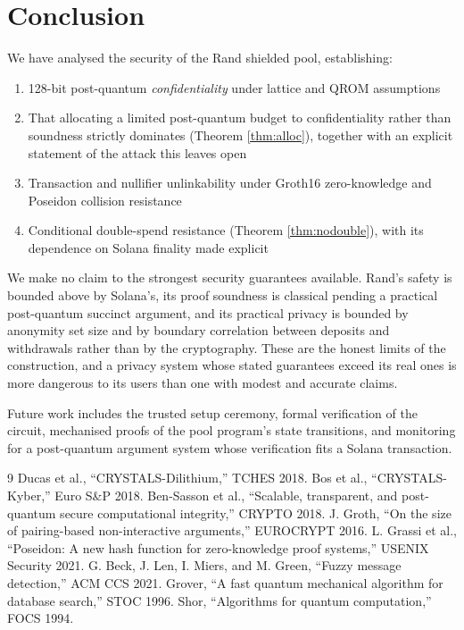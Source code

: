 \documentclass[11pt,a4paper]{article}
\begin{document}
\section{Conclusion}

We have analysed the security of the Rand shielded pool, establishing:

\begin{enumerate}
    \item 128-bit post-quantum \emph{confidentiality} under lattice and QROM assumptions
    \item That allocating a limited post-quantum budget to confidentiality rather than soundness strictly dominates (Theorem \ref{thm:alloc}), together with an explicit statement of the attack this leaves open
    \item Transaction and nullifier unlinkability under Groth16 zero-knowledge and Poseidon collision resistance
    \item Conditional double-spend resistance (Theorem \ref{thm:nodouble}), with its dependence on Solana finality made explicit
\end{enumerate}

We make no claim to the strongest security guarantees available. Rand's safety is bounded above by Solana's, its proof soundness is classical pending a practical post-quantum succinct argument, and its practical privacy is bounded by anonymity set size and by boundary correlation between deposits and withdrawals rather than by the cryptography. These are the honest limits of the construction, and a privacy system whose stated guarantees exceed its real ones is more dangerous to its users than one with modest and accurate claims.

Future work includes the trusted setup ceremony, formal verification of the circuit, mechanised proofs of the pool program's state transitions, and monitoring for a post-quantum argument system whose verification fits a Solana transaction.


\begin{thebibliography}{9}
 Ducas et al., ``CRYSTALS-Dilithium,'' TCHES 2018.
 Bos et al., ``CRYSTALS-Kyber,'' Euro S\&P 2018.
 Ben-Sasson et al., ``Scalable, transparent, and post-quantum secure computational integrity,'' CRYPTO 2018.
 J. Groth, ``On the size of pairing-based non-interactive arguments,'' EUROCRYPT 2016.
 L. Grassi et al., ``Poseidon: A new hash function for zero-knowledge proof systems,'' USENIX Security 2021.
 G. Beck, J. Len, I. Miers, and M. Green, ``Fuzzy message detection,'' ACM CCS 2021.
 Grover, ``A fast quantum mechanical algorithm for database search,'' STOC 1996.
 Shor, ``Algorithms for quantum computation,'' FOCS 1994.
\end{thebibliography}
\end{document}
